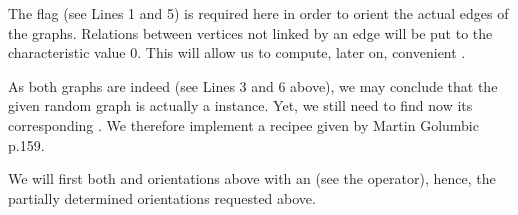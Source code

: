 \documentclass[a4paper,10pt,english]{sphinxhowto}
\begin{document}
\begin{sphinxVerbatim}[commandchars=\\\{\},numbers=left,firstnumber=1,stepnumber=1]
  
  
  
  
\end{sphinxVerbatim}

The  flag (see Lines 1 and 5) is required here in order to orient  the actual edges of the graphs. Relations between vertices not linked by an edge will be put to the  characteristic value 0. This will allow us to compute, later on, convenient .

As both graphs are indeed  (see Lines 3 and 6 above), we may conclude that the given random graph  is actually a  instance. Yet, we still need to find now its corresponding . We therefore implement a recipee given by Martin Golumbic  p.159.

We will first  both  and  orientations above with an  (see the  operator), hence, the partially determined orientations requested above.
\end{document}
